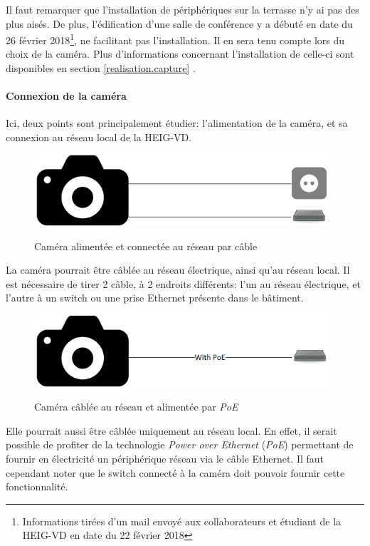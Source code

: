 Il faut remarquer que l'installation de périphériques sur la terrasse n'y ai pas des plus aisés. De plus, l'édification d'une salle de conférence y a débuté en date du 26 février 2018\footnote{Informations tirées d'un mail envoyé aux collaborateurs et étudiant de la HEIG-VD en date du 22 février 2018}, ne facilitant pas l'installation. Il en sera tenu compte lors du choix de la caméra. Plus d'informations concernant l'installation de celle-ci sont disponibles en section \ref{realisation.capture} .

\paragraph{Connexion de la caméra}

Ici, deux points sont principalement étudier: l'alimentation de la caméra, et sa connexion au réseau local de la HEIG-VD.  

\begin{figure}[H]
    \includegraphics[width=110mm]{img/conception/cam_con_1.png}
    \label{fig:cam_connection_1}
    \centering
    \caption{Caméra alimentée et connectée au réseau par câble}
\end{figure}

La caméra pourrait être câblée au réseau électrique, ainsi qu'au réseau local. Il est nécessaire de tirer 2 câble, à 2 endroits différents: l'un au réseau électrique, et l'autre à un switch ou une prise Ethernet présente dans le bâtiment.

\begin{figure}[H]
    \includegraphics[width=110mm]{img/conception/cam_con_2.png}
    \label{fig:cam_connection_2}
    \centering
    \caption{Caméra câblée au réseau et alimentée par \textit{PoE}}
\end{figure}

Elle pourrait aussi être câblée uniquement au réseau local. En effet, il serait possible de profiter de la technologie \textit{Power over Ethernet} (\textit{PoE}) permettant de fournir en électricité un périphérique réseau via le câble Ethernet. Il faut cependant noter que le switch connecté à la caméra doit pouvoir fournir cette fonctionnalité.

